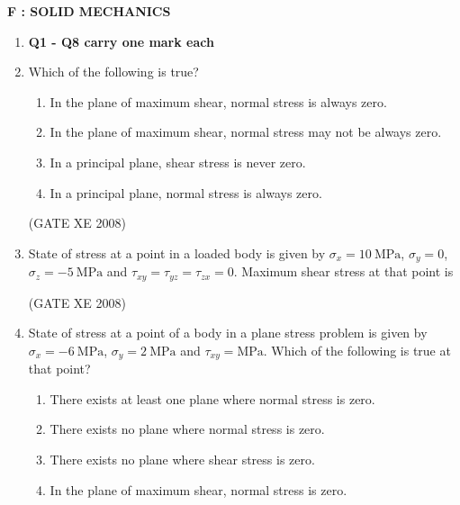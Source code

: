 \documentclass[12pt]{article}
\begin{document}
\newpage

\begin{center}
    \textbf{\Large F : SOLID MECHANICS}
\end{center}

\begin{enumerate}
\item[] \textbf{Q1 - Q8 carry one mark each}

\item Which of the following is true?  

\begin{enumerate}

\item  In the plane of maximum shear, normal stress is always zero.
\item  In the plane of maximum shear, normal stress may not be always zero.
\item  In a principal plane, shear stress is never zero.
\item  In a principal plane, normal stress is always zero. 
\end{enumerate}

(GATE XE 2008)

\item State of stress at a point in a loaded body is given by $\sigma_x = 10 \ \text{MPa}$, $\sigma_y = 0$, $\sigma_z = -5 \ \text{MPa}$ and $\tau_{xy} = \tau_{yz} = \tau_{zx} = 0$. Maximum shear stress at that point is  

\begin{enumerate}
\end{enumerate}

(GATE XE 2008)

\item State of stress at a point of a body in a plane stress problem is given by $\sigma_x = -6 \ \text{MPa}$, $\sigma_y = 2 \ \text{MPa}$ and $\tau_{xy} = \text{MPa}$. Which of the following is true at that point?  

\begin{enumerate}
\item  There exists at least one plane where normal stress is zero. 
\item  There exists no plane where normal stress is zero.  
\item  There exists no plane where shear stress is zero.  
\item  In the plane of maximum shear, normal stress is zero. 
\end{enumerate}


\end{enumerate}
\end{document}
